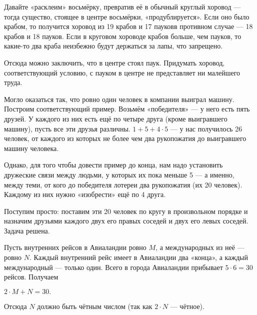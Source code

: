 \begin{itemize}
\itA Давайте «расклеим» восьмёрку, превратив её в обычный круглый хоровод — тогда существо, стоящее в центре восьмёрки, «продублируется». Если оно было крабом, то получится хоровод из 19 крабов и 17 пауков\scolon в противном случае — 18 крабов и 18 пауков. Если в круговом хороводе крабов больше, чем пауков, то какие-то два краба неизбежно будут держаться за лапы, что запрещено.

\ms Отсюда можно заключить, что в центре стоял паук. Придумать хоровод, соответствующий условию, с пауком в центре не представляет ни малейшего труда.

\itB Могло оказаться так, что ровно один человек в компании выиграл машину. Построим соответствующий пример. Возьмём «победителя» — у него есть пять друзей. У каждого из них есть ещё по четыре друга (кроме выигравшего машину), пусть все эти друзья различны. $1+5+4 \cdot 5$ — у нас получилось 26 человек, от каждого из которых не более чем два рукопожатия до выигравшего машину человека.

\ms Однако, для того чтобы довести пример до конца, нам надо установить дружеские связи между людьми, у которых их пока меньше 5 — а именно, между теми, от кого до победителя лотереи два рукопожатия (их 20 человек). Каждому из них нужно «изобрести» ещё по 4 друга.

\ms Поступим просто: поставим эти 20 человек по кругу в произвольном порядке и назначим друзьями каждого двух его правых соседей и двух его левых соседей. Задача решена.

\itC Пусть внутренних рейсов в Авиаландии ровно $M$, а международных из неё — ровно $N$. Каждый внутренний рейс имеет в Авиаландии два «конца», а каждый международный — только один. Всего в города Авиаландии прибывает $5 \cdot 6 = 30$ рейсов. Получаем

$2 \cdot M + N = 30.$

Отсюда $N$ должно быть чётным числом (так как $2 \cdot N$ — чётное).
\end{itemize}